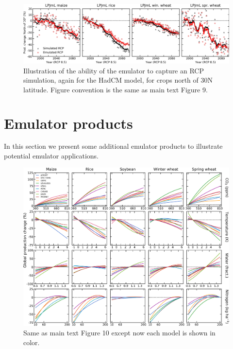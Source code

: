 \documentclass[12pt]{article}
\begin{document}
{{\begin{figure}[h!]
  \centering
  \includegraphics[width = 16.3cm]{LPJMLRCP85comp_30N.png}
  \caption{
  Illustration of the ability of the emulator to capture an RCP simulation, again for the HadCM model, for crops north of 30N latitude. Figure convention is the same as main text Figure 9.
  }
  \label{fig:lpjmlrcp}
\end{figure}

\clearpage
\section{Emulator products}
\begin{flushleft}
In this section we present some additional emulator products to illustrate potential emulator applications. 
\end{flushleft}

\begin{figure}[h!]
  \centering
  \includegraphics[width = 16.3cm]{em_CTWN_all_crops_color.png}
  \caption{
  Same as main text Figure 10 except now each model is shown in color.
  }
  \label{fig:all_dims}
\end{figure}

}}
\end{document}
